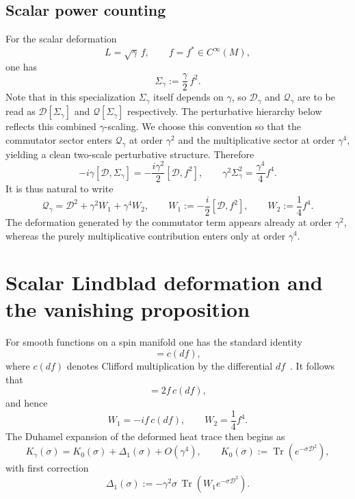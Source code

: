 \documentclass[11pt,a4paper]{article}
\numberwithin{equation}{section}
\theoremstyle{definition}
\newcommand{\cD}{\mathcal{D}}
\newcommand{\Qg}{\mathcal{Q}_\gamma}
\newcommand{\Dg}{\mathcal{D}_\gamma}
\newcommand{\Sig}{\Sigma}
\newcommand{\Tr}{\operatorname{Tr}}
\begin{document}
\subsection{Scalar power counting}
\label{sec:powercounting}

For the scalar deformation
\begin{equation}
L=\sqrt{\gamma}\,f, \qquad f=f^*\in C^\infty(M),
\end{equation}
one has
\begin{equation}
\Sig_\gamma:=\frac{\gamma}{2}\, f^2.
\end{equation}
Note that in this specialization $\Sig_\gamma$ itself depends on $\gamma$, so
$\Dg$ and $\Qg$ are to be read as $\mathcal{D}[\Sigma_\gamma]$ and
$\mathcal{Q}[\Sigma_\gamma]$ respectively. The perturbative hierarchy
below reflects this combined $\gamma$-scaling. We choose this convention
so that the commutator sector enters $\Qg$ at order $\gamma^2$ and the
multiplicative sector at order $\gamma^4$, yielding a clean two-scale
perturbative structure. Therefore
\begin{equation}
-i\gamma[\cD,\Sig_\gamma]=-\frac{i\gamma^2}{2}[\cD,f^2],
\qquad
\gamma^2\Sig_\gamma^2=\frac{\gamma^4}{4}f^4.
\end{equation}
It is thus natural to write
\begin{equation}
\Qg=\cD^2+\gamma^2 W_1+\gamma^4 W_2,
\qquad
W_1:=-\frac{i}{2}[\cD,f^2],
\qquad
W_2:=\frac{1}{4} f^4.
\label{eq:Qg_scalar_split}
\end{equation}
The deformation generated by the commutator term appears already at order
$\gamma^2$, whereas the purely multiplicative contribution enters only at
order $\gamma^4$.

\section{Scalar Lindblad deformation and the vanishing proposition}
\label{sec:vanishing}

For smooth functions on a spin manifold one has the standard identity
\begin{equation}
[\cD,f]=c(df),
\end{equation}
where $c(df)$ denotes Clifford multiplication by the differential
$df$~\cite{BerlineGetzlerVergne1992,LawsonMichelsohn1989}.
It follows that
\begin{equation}
[\cD,f^2]=2f\,c(df),
\end{equation}
and hence
\begin{equation}
W_1=-if\,c(df),
\qquad
W_2=\frac{1}{4} f^4.
\end{equation}
The Duhamel expansion of the deformed heat trace then begins as
\begin{equation}
K_\gamma(\sigma)=K_0(\sigma)+\Delta_1(\sigma)+O(\gamma^4),
\qquad
K_0(\sigma):=\Tr(e^{-\sigma \cD^2}),
\end{equation}
with first correction
\begin{equation}
\Delta_1(\sigma):=-\gamma^2\sigma\,\Tr(W_1e^{-\sigma\cD^2}).
\end{equation}
\end{document}
